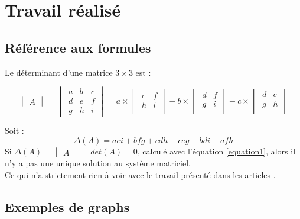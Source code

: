 \documentclass[a4paper, french, 8pt]{report}
\begin{document}
\chapter{Travail réalisé}
\label{chapitre2}

\section{Référence aux formules}
\label{section3}
Le déterminant d'une matrice $3 \times 3$ est :

\[
\begin{vmatrix} A \end{vmatrix} = 
\begin{vmatrix}
~ a & b & c\\
~ d & e & f\\
~ g & h & i
\end{vmatrix}  = 
a \times 
\begin{vmatrix}
~ e & f\\
~ h & i\\
\end{vmatrix}
- b \times 
\begin{vmatrix}
~ d & f\\
~ g & i\\
\end{vmatrix}
- c \times 
\begin{vmatrix}
~ d & e\\
~ g & h\\
\end{vmatrix}
\]

Soit :
\begin{equation}
  \Delta (A) = aei + bfg + cdh - ceg - bdi - afh 
  \label{equation1}
  \tag{1}
\end{equation}
Si $ \Delta (A) = \begin{vmatrix} A \end{vmatrix} = det(A) = 0 $, calculé avec l'équation \ref{equation1}, alors il n'y a pas une unique solution au système matriciel. \\
Ce qui n'a strictement rien à voir avec le travail présenté dans les articles \cite{burke1997automated, springerlink:10.1007/s10479-011-0997-x}.

\section{Exemples de graphs}
\label{section4}
\end{document}

